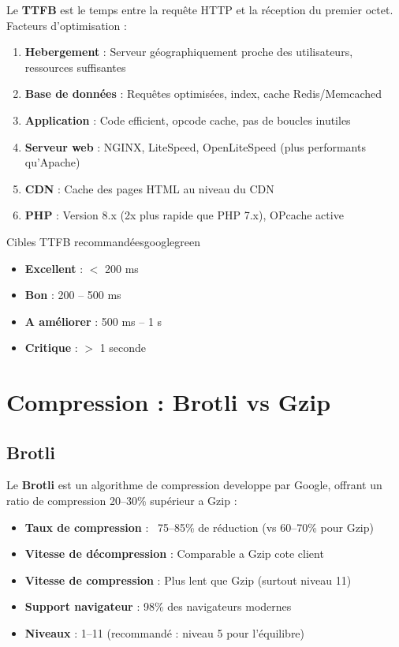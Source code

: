 \documentclass[12pt,a4paper,twoside]{report}
\newcommand{\keyword}[1]{\textbf{\textcolor{googleblue}{#1}}}
\begin{document}
Le \keyword{TTFB} est le temps entre la requête HTTP et la réception du premier octet. Facteurs d'optimisation :

\begin{enumerate}
    \item \textbf{Hebergement} : Serveur géographiquement proche des utilisateurs, ressources suffisantes
    \item \textbf{Base de données} : Requêtes optimisées, index, cache Redis/Memcached
    \item \textbf{Application} : Code efficient, opcode cache, pas de boucles inutiles
    \item \textbf{Serveur web} : NGINX, LiteSpeed, OpenLiteSpeed (plus performants qu'Apache)
    \item \textbf{CDN} : Cache des pages HTML au niveau du CDN
    \item \textbf{PHP} : Version 8.x (2x plus rapide que PHP 7.x), OPcache active
\end{enumerate}

\begin{mybox}{Cibles TTFB recommandées}{googlegreen}
\begin{itemize}
    \item \textbf{Excellent} : $<$ 200 ms
    \item \textbf{Bon} : 200 -- 500 ms
    \item \textbf{A améliorer} : 500 ms -- 1 s
    \item \textbf{Critique} : $>$ 1 seconde
\end{itemize}
\end{mybox}

\section{Compression : Brotli vs Gzip}

\subsection{Brotli}

Le \keyword{Brotli} est un algorithme de compression developpe par Google, offrant un ratio de compression 20--30\% supérieur a Gzip :

\begin{itemize}
    \item \textbf{Taux de compression} : ~75--85\% de réduction (vs 60--70\% pour Gzip)
    \item \textbf{Vitesse de décompression} : Comparable a Gzip cote client
    \item \textbf{Vitesse de compression} : Plus lent que Gzip (surtout niveau 11)
    \item \textbf{Support navigateur} : 98\% des navigateurs modernes
    \item \textbf{Niveaux} : 1--11 (recommandé : niveau 5 pour l'équilibre)
\end{itemize}
\end{document}
